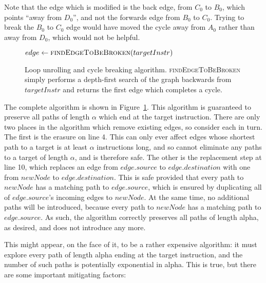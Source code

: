 Note that the edge which is modified is the back edge, from $C_0$ to
$B_0$, which points ``away from $D_0$'', and not the forwards edge
from $B_0$ to $C_0$.  Trying to break the $B_0$ to $C_0$ edge would
have moved the cycle away from $A_0$ rather than away from $D_0$,
which would not be helpful.

\begin{figure}
\begin{algorithmic}[1]
     \State $edge \gets \textsc{findEdgeToBeBroken}(targetInstr)$
     \Else
        \EndFor
     \EndIf
  \EndWhile
\end{algorithmic}
\caption{Loop unrolling and cycle breaking algorithm.
  \textsc{findEdgeToBeBroken} simply performs a depth-first search of
  the graph backwards from $targetInstr$ and returns the first edge
  which completes a cycle.}
\label{fig:derive:read:unroll_cycle_break}
\end{figure}

The complete algorithm is shown in
Figure~\ref{fig:derive:read:unroll_cycle_break}.  This algorithm is
guaranteed to preserve all paths of length $\alpha$ which end at the
target instruction.  There are only two places in the algorithm which
remove existing edges, so consider each in turn.  The first is the
erasure on line 4.  This can only ever affect edges whose shortest
path to a target is at least $\alpha$ instructions long, and so cannot
eliminate any paths to a target of length $\alpha$, and is therefore
safe.  The other is the replacement step at line 10, which replaces an
edge from $edge.source$ to $edge.destination$ with one from $newNode$
to $edge.destination$.  This is safe provided that every path to
$newNode$ has a matching path to $edge.source$, which is ensured by
duplicating all of $edge.source$'s incoming edges to $newNode$.  At
the same time, no additional paths will be introduced, because every
path to $newNode$ has a matching path to $edge.source$.  As such, the
algorithm correctly preserves all paths of length \gls{alpha},
as desired, and does not introduce any more.

This might appear, on the face of it, to be a rather expensive
algorithm: it must explore every path of length \gls{alpha}
ending at the target instruction, and the number of such paths is
potentially exponential in \gls{alpha}.  This is true, but
there are some important mitigating factors:

